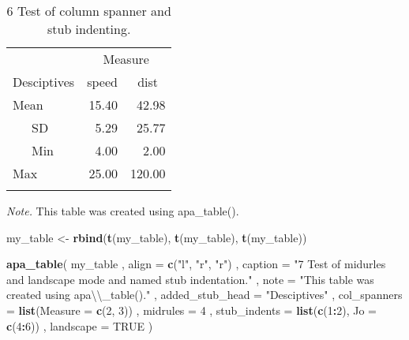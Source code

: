 \documentclass[english,man]{apa6}
\newenvironment{Shaded}{\begin{snugshade}}{\end{snugshade}}
\newcommand{\KeywordTok}[1]{\textcolor[rgb]{0.13,0.29,0.53}{\textbf{#1}}}
\newcommand{\DataTypeTok}[1]{\textcolor[rgb]{0.13,0.29,0.53}{#1}}
\newcommand{\DecValTok}[1]{\textcolor[rgb]{0.00,0.00,0.81}{#1}}
\newcommand{\CharTok}[1]{\textcolor[rgb]{0.31,0.60,0.02}{#1}}
\newcommand{\StringTok}[1]{\textcolor[rgb]{0.31,0.60,0.02}{#1}}
\newcommand{\OtherTok}[1]{\textcolor[rgb]{0.56,0.35,0.01}{#1}}
\newcommand{\OperatorTok}[1]{\textcolor[rgb]{0.81,0.36,0.00}{\textbf{#1}}}
\newcommand{\NormalTok}[1]{#1}
\theoremstyle{definition}
\theoremstyle{definition}
\theoremstyle{definition}
\theoremstyle{remark}
\begin{document}
\begin{table}[tbp]
\begin{center}
\begin{threeparttable}
\caption{\label{tab:unnamed-chunk-5}6 Test of column spanner and stub indenting.}
\begin{tabular}{lrr}
\toprule
 & \multicolumn{2}{c}{Measure} \\
\cmidrule(r){2-3}
Desciptives & \multicolumn{1}{c}{speed} & \multicolumn{1}{c}{dist}\\
\midrule
Mean & 15.40 & 42.98\\
\ \ \ SD & 5.29 & 25.77\\
\ \ \ Min & 4.00 & 2.00\\
Max & 25.00 & 120.00\\
\bottomrule
\addlinespace
\end{tabular}
\begin{tablenotes}[para]
\textit{Note.} This table was created using apa\_table().
\end{tablenotes}
\end{threeparttable}
\end{center}
\end{table}

\begin{Shaded}
\begin{Highlighting}[]
\NormalTok{my_table <-}\StringTok{ }\KeywordTok{rbind}\NormalTok{(}\KeywordTok{t}\NormalTok{(my_table), }\KeywordTok{t}\NormalTok{(my_table), }\KeywordTok{t}\NormalTok{(my_table))}

\KeywordTok{apa_table}\NormalTok{(}
\NormalTok{  my_table}
\NormalTok{  , }\DataTypeTok{align =} \KeywordTok{c}\NormalTok{(}\StringTok{"l"}\NormalTok{, }\StringTok{"r"}\NormalTok{, }\StringTok{"r"}\NormalTok{)}
\NormalTok{  , }\DataTypeTok{caption =} \StringTok{"7 Test of midurles and landscape mode and named stub indentation."}
\NormalTok{  , }\DataTypeTok{note =} \StringTok{"This table was created using apa}\CharTok{\textbackslash{}\textbackslash{}}\StringTok{_table()."}
\NormalTok{  , }\DataTypeTok{added_stub_head =} \StringTok{"Desciptives"}
\NormalTok{  , }\DataTypeTok{col_spanners =} \KeywordTok{list}\NormalTok{(}\DataTypeTok{Measure =} \KeywordTok{c}\NormalTok{(}\DecValTok{2}\NormalTok{, }\DecValTok{3}\NormalTok{))}
\NormalTok{  , }\DataTypeTok{midrules =} \DecValTok{4}
\NormalTok{  , }\DataTypeTok{stub_indents =} \KeywordTok{list}\NormalTok{(}\KeywordTok{c}\NormalTok{(}\DecValTok{1}\OperatorTok{:}\DecValTok{2}\NormalTok{), }\DataTypeTok{Jo =} \KeywordTok{c}\NormalTok{(}\DecValTok{4}\OperatorTok{:}\DecValTok{6}\NormalTok{))}
\NormalTok{  , }\DataTypeTok{landscape =} \OtherTok{TRUE}
\NormalTok{)}
\end{Highlighting}
\end{Shaded}
\end{document}

